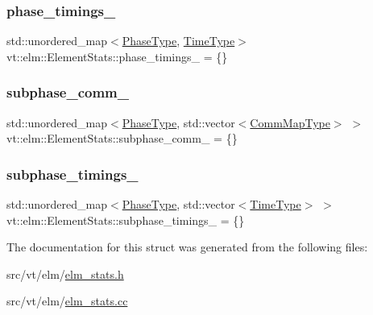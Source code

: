 \mbox{\label{structvt_1_1elm_1_1_element_stats_a7f9571931802777ac73afa0c0d8976f5}} 
\subsubsection{\texorpdfstring{phase\+\_\+timings\+\_\+}{phase\_timings\_}}
{\footnotesize\ttfamily std\+::unordered\+\_\+map$<$\hyperlink{namespacevt_a46ce6733d5cdbd735d561b7b4029f6d7}{Phase\+Type}, \hyperlink{namespacevt_a876a9d0cd5a952859c72de8a46881442}{Time\+Type}$>$ vt\+::elm\+::\+Element\+Stats\+::phase\+\_\+timings\+\_\+ = \{\}\hspace{0.3cm}{\ttfamily [protected]}}

\mbox{\label{structvt_1_1elm_1_1_element_stats_a8821119818d8ab253ebded8869b5e693}} 
\subsubsection{\texorpdfstring{subphase\+\_\+comm\+\_\+}{subphase\_comm\_}}
{\footnotesize\ttfamily std\+::unordered\+\_\+map$<$\hyperlink{namespacevt_a46ce6733d5cdbd735d561b7b4029f6d7}{Phase\+Type}, std\+::vector$<$\hyperlink{namespacevt_1_1elm_a38487cb8896b9b4763efa9022fab560e}{Comm\+Map\+Type}$>$ $>$ vt\+::elm\+::\+Element\+Stats\+::subphase\+\_\+comm\+\_\+ = \{\}\hspace{0.3cm}{\ttfamily [protected]}}

\mbox{\label{structvt_1_1elm_1_1_element_stats_ae1b1ff4ab1b86011d73bfc4f1a6fc2aa}} 
\subsubsection{\texorpdfstring{subphase\+\_\+timings\+\_\+}{subphase\_timings\_}}
{\footnotesize\ttfamily std\+::unordered\+\_\+map$<$\hyperlink{namespacevt_a46ce6733d5cdbd735d561b7b4029f6d7}{Phase\+Type}, std\+::vector$<$\hyperlink{namespacevt_a876a9d0cd5a952859c72de8a46881442}{Time\+Type}$>$ $>$ vt\+::elm\+::\+Element\+Stats\+::subphase\+\_\+timings\+\_\+ = \{\}\hspace{0.3cm}{\ttfamily [protected]}}



The documentation for this struct was generated from the following files\+:\begin{DoxyCompactItemize}
\item 
src/vt/elm/\hyperlink{elm__stats_8h}{elm\+\_\+stats.\+h}\item 
src/vt/elm/\hyperlink{elm__stats_8cc}{elm\+\_\+stats.\+cc}\end{DoxyCompactItemize}
